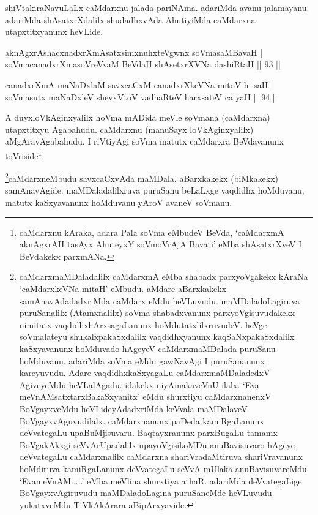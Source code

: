 \begin{artha}
shiVtakiraNavuLaLx caMdarxnu jalada pariNAma. adariMda avanu 
jalamayanu. adariMda shAsatxrXdalilx shudadhxvAda AhutiyiMda caMdarxna 
utapxtitxyanunx heVLide.
\end{artha}


\begin{shl}
aknAgxrAshacxnadxrXmAsatxsimxnuhxteV\s gwnx soVmasaMBavaH | \\
soVmacanadxrXmasoVreVvaM BeVdaH shAsetxrXVNa dashiRtaH \hfill|| 93 || 
\end{shl}

\begin{shl}
canadxrXmA maNaDxlaM savxcaCxM canadxrXkeVNa mitoV hi saH | \\
soVmasutx maNaDxleV shevxVtoV vadhaRteV harxsateV ca yaH \hfill|| 94 || 
\end{shl}

\begin{artha}
A duyxloVkAginxyalilx hoVma mADida meVle soVmana (caMdarxna) 
utapxtitx\-yu Agabahudu. caMdarxnu (manuSayx loVkAginxyalilx) 
aMgAravAgabahudu. I riVtiyAgi soVma matutx caMdarxra BeVdavanunx 
toVriside\footnote[2]{caMdarxnu kAraka, adara Pala soVma eMbudeV BeVda, 
`caMdarxmA aknAgxrAH tasAyx AhuteyxY soVmoVrAjA Bavati' eMba shAsatxrXveV I BeVdakekx parxmANa.}.
\end{artha}

\begin{artha}
\footnote[3]{caMdarxmaMDaladalilx caMdarxmA eMba shabadx parxyoVgakekx kAraNa `caMdarxkeVNa mitaH' eMbudu. aMdare aBarxkakekx samAnavAdadadxriMda caMdarx eMdu heVLuvudu. maMDaladoLagiruva puruSa\-nalilx (Atamxnalilx) soVma shabadxvanunx parxyoVgisuvudakekx nimitatx vaqdidhxhArxsagaLanunx hoMdutatxlilx\-ruvudeV. heVge soVmalateyu shukalxpakaSxdalilx vaqdidhxyanunx kaqSaNxpakaSxdalilx kaSxyavanunx hoMduvado hAgeyeV caMdarxmaMDalada puruSanu hoMduvanu. adariMda soVma eMdu gawNavAgi I puruSananunx kareyuvudu. Adare vaqdidhxkaSxyagaLu caMdarxmaMDaladedxV AgiveyeMdu heVLalAgadu. idakekx niyAmakaveVnU ilalx. `Eva meVnAMsatxtarxBakaSxyanitx' eMdu shurxtiyu caMdarxnanenxV BoVgayx\-veMdu heVLideyAdadxriMda keVvala maMDalaveV BoVgayxvAguvudilalx. caMdarxnanunx paDeda kamiR\-gaLanunx deVvategaLu upaBuMjisuvaru. Baqtayxranunx parxBugaLu tamamx BoVgakAkxgi seVvArUpadalilx upa\-yoVgisikoMDu anuBavisuvaro hAgeye deVvategaLu caMdarxnalilx caMdarxna shariVradaMtiruva shariVravanunx hoMdiruva kamiRgaLanunx deVvategaLu seVvA mUlaka anuBavisuvareMdu `EvameV\-nAM.....' eMba meVlina shurxtiya athaR. adariMda deVvategaLige BoVgayxvAgiruvudu maMDaladoLagina puruSaneMde heVLuvudu yukatxveMdu TiVkAkArara aBipArxyavide.}caMdarxneMbudu savxcaCxvAda maMDala. aBarxkakekx (biMkakekx) samAnavAgide. maMDaladalilxruva puruSanu beLaLxge vaqdidhx hoMduvanu, matutx kaSxyavanunx hoMduvanu yAroV avaneV soVmanu.
\end{artha}


